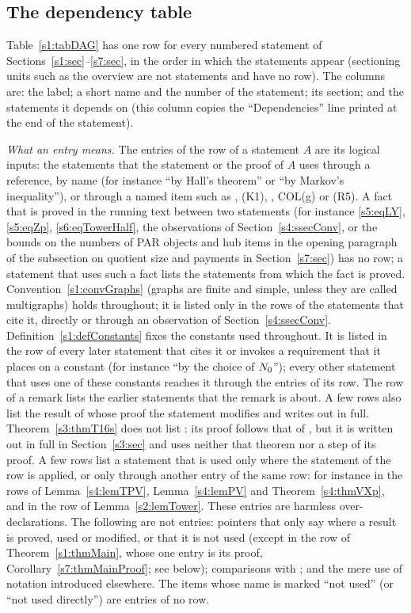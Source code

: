 \subsection{The dependency table}\label{s1:ssecDAG}

Table~\ref{s1:tabDAG} has one row for every numbered statement of
Sections~\ref{s1:sec}--\ref{s7:sec}, in the order in which the statements appear
(sectioning units such as the overview are not statements and have no row). The
columns are: the label; a short name and the number of the statement; its
section; and the statements it depends on (this column copies the
``Dependencies'' line printed at the end of the statement).

\emph{What an entry means.} The entries of the row of a statement $A$ are
its logical inputs: the statements that the statement or the proof of $A$ uses
through a reference, by name (for instance ``by Hall's theorem'' or ``by
Markov's inequality''), or through a named item such as , (K1), ,
COL(g) or (R5). A fact that is proved in the running text between two
statements (for instance \eqref{s5:eqLY}, \eqref{s5:eqZp},
\eqref{s6:eqTowerHalf}, the observations of Section~\ref{s4:ssecConv}, or the
bounds on the numbers of PAR objects and hub items in the opening paragraph of
the subsection on quotient size and payments in Section~\ref{s7:sec}) has no
row; a statement that
uses such a fact lists the statements from which the fact is proved.
Convention~\ref{s1:convGraphs} (graphs are finite and simple, unless they are
called multigraphs) holds throughout; it is listed only in the rows of the
statements that cite it, directly or through an observation of
Section~\ref{s4:ssecConv}. Definition~\ref{s1:defConstants} fixes the constants
used throughout. It is listed in the row of every later statement that cites it
or invokes a requirement that it places on a constant (for instance ``by the
choice of $N_{0}$''); every other statement that uses one of these constants
reaches it through the entries of its row. The row of a remark lists the earlier
statements that the remark is about. A few rows also list the result of
\cite{BM} whose proof the statement modifies and writes out in full.
Theorem~\ref{s3:thmT16s} does not list \cite[Theorem~16]{BM}: its proof follows
that of \cite[Theorem~16]{BM}, but it is written out in full in
Section~\ref{s3:sec} and uses neither that theorem nor a step of its proof. A few
rows list a statement that is used only where the statement of the row is
applied, or only through another entry of the same row: for instance  in
the rows of Lemma~\ref{s4:lemTPV}, Lemma~\ref{s4:lemPV} and
Theorem~\ref{s4:thmVXp}, and  in the row of Lemma~\ref{s2:lemTower}. These
entries are harmless over-declarations. The following are not entries: pointers
that only say where a result is proved, used or modified, or that it is not
used (except in the row of Theorem~\ref{s1:thmMain}, whose one entry is its
proof, Corollary~\ref{s7:thmMainProof}; see below); comparisons with \cite{BM}; and the mere use of notation introduced
elsewhere. The items whose name is marked ``not used'' (or ``not used
directly'') are entries of no row.


